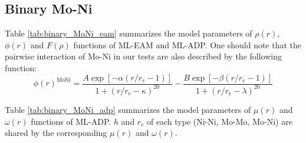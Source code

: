 \documentclass[prb,preprint]{revtex4-2}
\begin{document}
\subsection{Binary Mo-Ni}
\label{sec:binary}

Table \ref{tab:binary_MoNi_eam} summarizes the model parameters of $\rho(r)$, 
$\phi(r)$ and $F(\rho)$ functions of ML-EAM and ML-ADP. One should note that
the pairwise interaction of Mo-Ni in our tests are also described by the 
following function:
\begin{equation}
\phi(r)^{\mathrm{MoNi}} = 
\frac{A \exp\left[ -\alpha\left( r/r_{e} - 1 \right) \right]}
{1 + \left(r / r_{e} - \kappa\right)^{20}} - 
\frac{B \exp\left[ -\beta\left( r/r_{e} - 1 \right) \right]}
{1 + \left(r / r_{e} - \lambda\right)^{20}}
\end{equation}

Table \ref{tab:binary_MoNi_adp} summarizes the model parameters of $\mu(r)$ and 
$\omega(r)$ functions of ML-ADP. $h$ and $r_{c}$ of each type (Ni-Ni, Mo-Mo, 
Mo-Ni) are shared by the corresponding $\mu(r)$ and $\omega(r)$.
\end{document}
